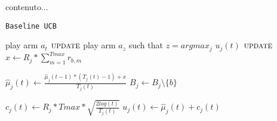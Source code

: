 \iffalse
	contenuto...




\begin{algorithm}[!h]
	\caption{\texttt{Baseline UCB}}
	\begin{scriptsize}
		\begin{algorithmic}[1]
			
			
			\Statex
			 
				\State play arm $a_t$\;
				\State $\textsc{update}$
			\EndFor
			 
				\State play arm $a_z$ such that  $z = argmax_j$ $u_j (t)$\;
				\State $\textsc{update}$
			\EndFor
			\EndFunction
			\Statex
						\State$x \gets   R_j * \sum_{m=1}^{Tmax}r_{b,m} $\;
						
						\State$\hat{\mu}_j(t) \gets \frac{\hat{\mu}_j(t-1)*(T_j(t)-1)+x}{T_j(t)}$\;
						\State$B_j \gets B_j \setminus \{b\}$\;	
										
					\EndIf				
				\EndFor			
				
			\State$c_j(t)\gets R_j * Tmax * \sqrt{\frac{2log(t)}{T_j(t)}}$\;
			\State$u_j(t) \gets  \hat{\mu}_j(t) +  c_j(t)$
			\EndFor
			
			
			
			
			\EndFunction
			
		\end{algorithmic}
	\end{scriptsize}
	\label{alg:BaselineUCB}
\end{algorithm}


